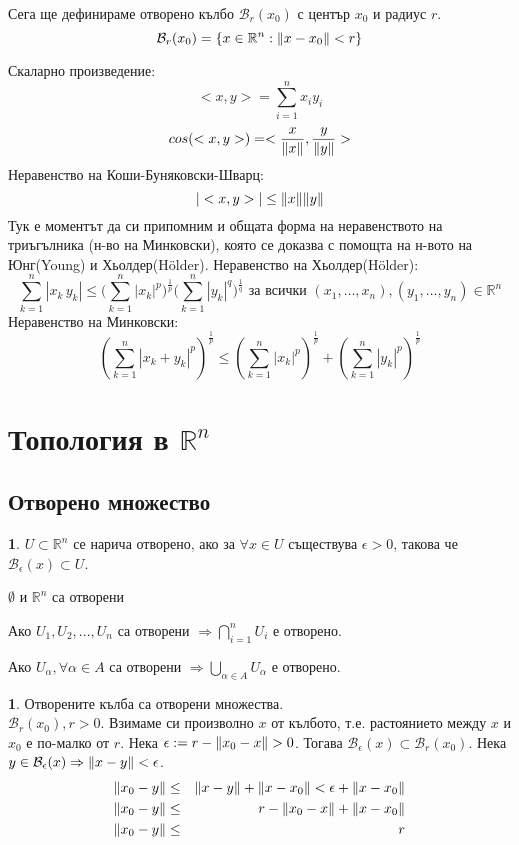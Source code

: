 \documentclass[11pt]{article}
\numberwithin{equation}{section}
\numberwithin{figure}{section}
\numberwithin{table}{section}
\theoremstyle{plain}
\theoremstyle{definition}
\newtheorem{defn}[thm]{\protect\definitionname}
\theoremstyle{remark}
\theoremstyle{definition}
\theoremstyle{remark}
\theoremstyle{plain}
\theoremstyle{definition}
\theoremstyle{definition}
\newtheorem{example}[thm]{\protect\examplename}
\theoremstyle{plain}
\theoremstyle{plain}
\theoremstyle{plain}
\theoremstyle{definition}
\theoremstyle{plain}
\providecommand{\definitionname}{Дефиниция}
\providecommand{\examplename}{Пример}
\DeclarePairedDelimiter\norm{\lVert}{\rVert}
\newcommand*{\B}{\mathcal{B}}
\newcommand*{\R}{\mathbb{R}}
\begin{document}
Сега ще дефинираме отворено кълбо $\mathcal{B}_r(x_0)$ с център $x_0$ и радиус $r$. $$\B_r(x_0) = \{x\in \mathbb{R}^n : \norm{x-x_0}<r\}$$

Скаларно произведение:
$$<x, y> = \sum_{i=1}^n x_i y_i$$
$$cos(<x,y>) = <\frac{x}{\norm{x}}, \frac{y}{\norm{y}}>$$
Неравенство на Коши-Буняковски-Шварц:
$$|<x, y>| \leq \norm{x}\norm{y}$$
Тук е моментът да си припомним и общата форма на неравенството на триъгълника (н-во на Минковски), която се доказва с помощта на н-вото на Юнг(Young) и Хьолдер(Hölder).
Неравенство на Хьолдер(Hölder):
$$\sum_{k=1}^n |x_k\,y_k| \le \biggl( \sum_{k=1}^n |x_k|^p \biggr)^{\frac{1}{p}} \biggl( \sum_{k=1}^n |y_k|^q \biggr)^{\frac{1}{q}}
\text{ за всички }(x_1,\ldots,x_n),(y_1,\ldots,y_n)\in\mathbb{R}^n$$
Неравенство на Минковски:
$$\left( \sum_{k=1}^n |x_k + y_k|^p \right)^{\frac{1}{p}} \le \left( \sum_{k=1}^n |x_k|^p \right)^{\frac{1}{p}} + \left( \sum_{k=1}^n |y_k|^p \right)^{\frac{1}{p}}$$

\section{Топология в $\mathbb{R}^n$}
\subsection{Отворено множество}

\begin{defn}
$U\subset\R^n$ се нарича отворено, ако за $\forall x \in U$ съществува $\epsilon>0$, такова че $\B_\epsilon (x) \subset U$.
\end{defn}


$\emptyset$ и $\R^n$ са отворени

Ако $U_1, U_2, ..., U_n$ са отворени $\Rightarrow \bigcap_{i=1}^n U_i$ е отворено.

Ако $U_\alpha, \forall \alpha \in A$ са отворени $\Rightarrow \bigcup _{\alpha \in A} U_\alpha$ е отворено.

\begin{example}
Отворените кълба са отворени множества.\\
$\B_r(x_0), r>0$. Взимаме си произволно $x$ от кълбото, т.е. растоянието между $x$ и $x_0$ е по-малко от $r$. Нека $\epsilon := r - \norm{x_0-x}>0$. Тогава $\B_\epsilon(x)\subset\B_r(x_0)$. Нека $y\in\B_\epsilon(x) \Rightarrow \norm{x-y}<\epsilon$.
\begin{eqnarray*}
\norm{x_0-y} &\leq& \norm{x-y} + \norm{x-x_0} < \epsilon + \norm{x-x_0}\\
\norm{x_0-y} &\leq& r - \norm{x_0-x} + \norm{x-x_0}\\
\norm{x_0-y} &\leq& r
\end{eqnarray*}
\end{example}
\end{document}
